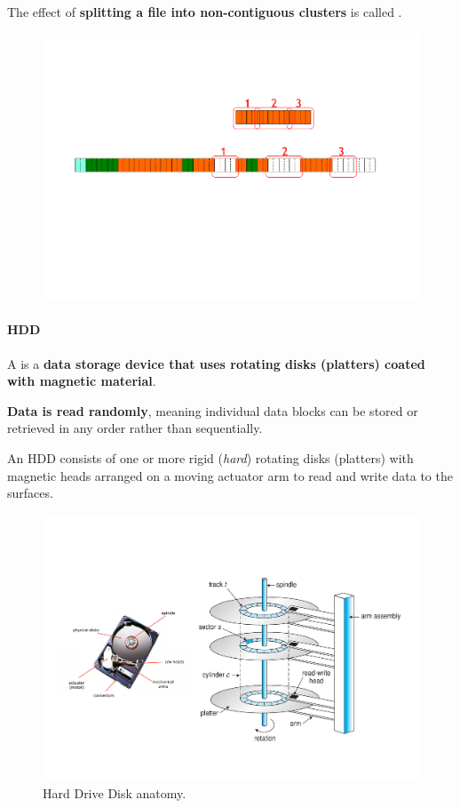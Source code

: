 \begin{itemize}
    The effect of \textbf{splitting a file into non-contiguous clusters} is called .
    \begin{figure}[!htp]
        \centering
        \includegraphics[width=\textwidth]{img/files-5.pdf}
    \end{figure}
\end{itemize}

\newpage

\paragraph{HDD}

A  is a \textbf{data storage device that uses rotating disks (platters) coated with magnetic material}.

\highspace
\textbf{Data is read randomly}, meaning individual data blocks can be stored or retrieved in any order rather than sequentially.

\highspace
An HDD consists of one or more rigid (\emph{hard}) rotating disks (platters) with magnetic heads arranged on a moving actuator arm to read and write data to the surfaces.

\begin{figure}[!htp]
    \centering
    \includegraphics[width=\textwidth]{img/files-6.pdf}
    \caption{Hard Drive Disk anatomy.}
\end{figure}

